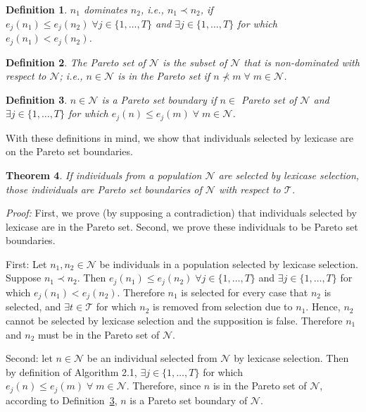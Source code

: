 \documentclass[twoside]{article}
\newtheorem{lex}{Theorem}[section]
\newtheorem{defn}[lex]{Definition}
\begin{document}
\begin{defn}\label{def:dom}
$n_1$ {\it dominates} $n_2$, i.e., ${n_1} \prec {n_2}$, if $e_j(n_1) \leq e_j(n_2) \;
\forall j  \in \{1,\dots,T\}$ and $\exists j \in \{1,\dots,T\}$ for which $e_j(n_1) < e_j(n_2)$. \bigskip
\end{defn}

\begin{defn}\label{def:pset}
The {\it Pareto set} of $\mathcal{N}$ is the subset of $\mathcal{N}$ that is non-dominated with respect to $\mathcal{N}$; i.e., $n \in \mathcal{N}$ is in the Pareto set if $n \nprec m \; \forall \; m \in \mathcal{N}$. 
\end{defn}

\begin{defn}\label{def:boundary}
$n \in \mathcal{N}$ is a {\it Pareto set boundary} if $n \in$ Pareto set of $\mathcal{N}$ and $\exists j \in \{1,\dots,T\}$ for which $e_j(n) \leq e_j(m) \; \forall \; m \in \mathcal{N}$. 
\end{defn}

With these definitions in mind, we show that individuals selected by lexicase are on the Pareto set boundaries. 

\begin{lex}\label{thm:lex}
If individuals from a population $\mathcal{N}$ are selected by lexicase selection, those individuals are Pareto set boundaries of $\mathcal{N}$ with respect to $\mathcal{T}$. 
\end{lex}

\noindent \textit{Proof:} First, we prove (by supposing a contradiction) that individuals selected by lexicase are in the Pareto set. Second, we prove these individuals to be Pareto set boundaries. 

First: Let $n_1, n_2 \in \mathcal{N}$ be individuals in a population selected by lexicase selection. Suppose $n_1 \prec n_2$. Then $e_j(n_1) \leq e_j(n_2) \;
\forall j  \in \{1,\dots,T\}$ and $\exists j \in \{1,\dots,T\}$ for which $e_j(n_1) < e_j(n_2)$. Therefore $n_1$ is selected for every case that $n_2$ is selected, and $\exists t \in \mathcal{T}$ for which $n_2$ is removed from selection due to $n_1$. Hence, $n_2$ cannot be selected by lexicase selection and the supposition is false. Therefore $n_1$ and $n_2$ must be in the Pareto set of $\mathcal{N}$. 

Second: let $n \in \mathcal{N}$ be an individual selected from $\mathcal{N}$ by lexicase selection. Then by definition of Algorithm 2.1, $\exists j \in \{1,\dots,T\}$ for which $e_j(n) \leq e_j(m) \; \forall \; m \in \mathcal{N}$. Therefore, since $n$ is in the Pareto set of $\mathcal{N}$, according to Definition~\ref{def:boundary}, $n$ is a Pareto set boundary of $\mathcal{N}$.  
\bigskip
\end{document}
